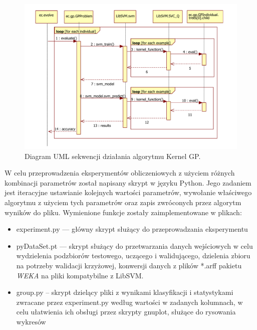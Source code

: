 \begin{figure}[h]
\centering
\includegraphics[scale=0.75]{figures/graphs/kernelgp}
\caption{Diagram UML sekwencji działania algorytmu Kernel GP.\label{fig:sequence}}
\end{figure}


W celu przeprowadzenia eksperymentów obliczeniowych z użyciem różnych kombinacji parametrów został napisany skrypt w języku Python. Jego zadaniem jest iteracyjne ustawianie kolejnych wartości parametrów, wywołanie właściwego algorytmu z użyciem tych parametrów oraz zapis zwróconych przez algorytm wyników do pliku. Wymienione funkcje zostały zaimplementowane w plikach:
\begin{itemize}
\item experiment.py --- główny skrypt służący do przeprowadzania eksperymentu
\item pyDataSet.pt --- skrypt służący do przetwarzania danych wejściowych w celu wydzielenia podzbiorów testowego, uczącego i walidującego, dzielenia zbioru na potrzeby walidacji krzyżowej, konwersji danych z plików *.arff pakietu \emph{WEKA} na pliki kompatybilne z LibSVM.
\item group.py -- skrypt dzielący pliki z wynikami klasyfikacji i statystykami zwracane przez experiment.py według wartości w zadanych kolumnach, w celu ułatwienia ich obsługi przez skrypty gnuplot, służące do rysowania wykresów 
\end{itemize}

